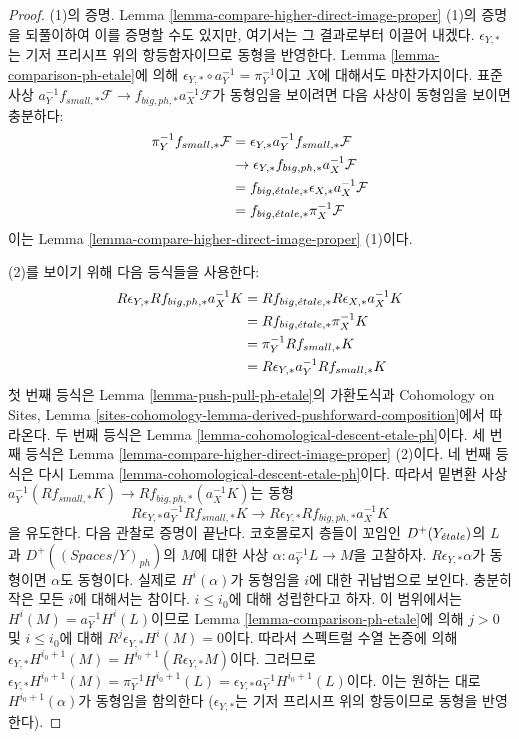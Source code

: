 \begin{proof}
(1)의 증명. Lemma \ref{lemma-compare-higher-direct-image-proper} (1)의
증명을 되풀이하여 이를 증명할 수도 있지만, 여기서는 그 결과로부터
이끌어 내겠다. $\epsilon_{Y, *}$는 기저 프리시프 위의 항등함자이므로
동형을 반영한다. Lemma \ref{lemma-comparison-ph-etale}에 의해
$\epsilon_{Y, *} \circ a_Y^{-1} = \pi_Y^{-1}$이고 $X$에 대해서도
마찬가지이다. 표준사상
$a_Y^{-1}f_{small, *}\mathcal{F} \to f_{big, ph, *}a_X^{-1}\mathcal{F}$가
동형임을 보이려면 다음 사상이 동형임을 보이면 충분하다:
\begin{align*}
\pi_Y^{-1}f_{small, *}\mathcal{F}
& =
\epsilon_{Y, *}a_Y^{-1}f_{small, *}\mathcal{F} \\
& \to 
\epsilon_{Y, *}f_{big, ph, *}a_X^{-1}\mathcal{F} \\
& =
f_{big, {\acute{e}tale}, *} \epsilon_{X, *}a_X^{-1}\mathcal{F} \\
& =
f_{big, {\acute{e}tale}, *}\pi_X^{-1}\mathcal{F}
\end{align*}
이는 Lemma \ref{lemma-compare-higher-direct-image-proper} (1)이다.

\medskip\noindent
(2)를 보이기 위해 다음 등식들을 사용한다:
\begin{align*}
R\epsilon_{Y, *}Rf_{big, ph, *}a_X^{-1}K
& =
Rf_{big, {\acute{e}tale}, *}R\epsilon_{X, *}a_X^{-1}K \\
& =
Rf_{big, {\acute{e}tale}, *}\pi_X^{-1}K \\
& =
\pi_Y^{-1}Rf_{small, *}K \\
& =
R\epsilon_{Y, *} a_Y^{-1}Rf_{small, *}K
\end{align*}
첫 번째 등식은 Lemma \ref{lemma-push-pull-ph-etale}의 가환도식과
Cohomology on Sites, Lemma
\ref{sites-cohomology-lemma-derived-pushforward-composition}에서 따라온다.
두 번째 등식은 Lemma \ref{lemma-cohomological-descent-etale-ph}이다.
세 번째 등식은 Lemma \ref{lemma-compare-higher-direct-image-proper} (2)이다.
네 번째 등식은 다시 Lemma
\ref{lemma-cohomological-descent-etale-ph}이다. 따라서 밑변환 사상
$a_Y^{-1}(Rf_{small, *}K) \to Rf_{big, ph, *}(a_X^{-1}K)$는 동형
$$
R\epsilon_{Y, *}a_Y^{-1}Rf_{small, *}K \to
R\epsilon_{Y, *}Rf_{big, ph, *}a_X^{-1}K
$$
을 유도한다. 다음 관찰로 증명이 끝난다. 코호몰로지 층들이 꼬임인
$D^+(Y_{\acute{e}tale})$의 $L$과 $D^+((\textit{Spaces}/Y)_{ph})$의 $M$에 대한
사상 $\alpha : a_Y^{-1}L \to M$을 고찰하자.
$R\epsilon_{Y, *}\alpha$가 동형이면 $\alpha$도 동형이다.
실제로 $H^i(\alpha)$가 동형임을 $i$에 대한 귀납법으로 보인다.
충분히 작은 모든 $i$에 대해서는 참이다. $i \leq i_0$에 대해
성립한다고 하자. 이 범위에서는
$H^i(M) = a_Y^{-1}H^i(L)$이므로 Lemma
\ref{lemma-comparison-ph-etale}에 의해 $j > 0$ 및 $i \leq i_0$에 대해
$R^j\epsilon_{Y, *}H^i(M) = 0$이다. 따라서 스펙트럴 수열 논증에 의해
$\epsilon_{Y, *}H^{i_0 + 1}(M) = H^{i_0 + 1}(R\epsilon_{Y, *}M)$이다.
그러므로
$\epsilon_{Y, *}H^{i_0 + 1}(M) = \pi_Y^{-1}H^{i_0 + 1}(L) =
\epsilon_{Y, *}a_Y^{-1}H^{i_0 + 1}(L)$이다. 이는 원하는 대로
$H^{i_0 + 1}(\alpha)$가 동형임을 함의한다
($\epsilon_{Y, *}$는 기저 프리시프 위의 항등이므로 동형을 반영한다).
\end{proof}



















